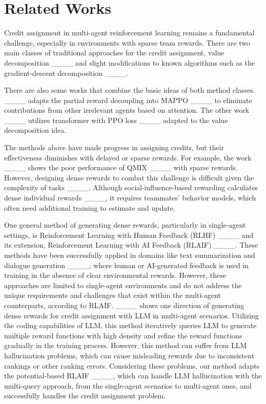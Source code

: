 \section{Related Works}
Credit assignment in multi-agent reinforcement learning remains a fundamental challenge, especially in environments with sparse team rewards. There are two main classes of traditional approaches for the credit assignment, value decomposition ____ and slight modifications to known algorithms such as the gradient-descent decomposition ____. 

There are also some works that combine the basic ideas of both method classes. ____ adapts the partial reward decoupling into MAPPO ____ to eliminate contributions from other irrelevant agents based on attention. The other work ____ utilizes transformer with PPO loss ____ adapted to the value decomposition idea.

The methods above have made progress in assigning credits, but their effectiveness diminishes with delayed or sparse rewards. For example, the work ____ shows the poor performance of QMIX ____ with sparse rewards. However, designing dense rewards to combat this challenge is difficult given the complexity of tasks ____. Although social-influence-based rewarding calculates dense individual rewards ____, it requires teammates' behavior models, which often need additional training to estimate and update.

One general method of generating dense rewards, particularly in single-agent settings, is Reinforcement Learning with Human Feedback (RLHF) ____ and its extension, Reinforcement Learning with AI Feedback (RLAIF) ____. These methods have been successfully applied in domains like text summarization and dialogue generation ____, where human or AI-generated feedback is used in training in the absence of clear environmental rewards. However, these approaches are limited to single-agent environments and do not address the unique requirements and challenges that exist within the multi-agent counterparts, according to RLAIF. ____ shows one direction of generating dense rewards for credit assignment with LLM in multi-agent scenarios. Utilizing the coding capabilities of LLM, this method iteratively queries LLM to generate multiple reward functions with high density and refine the reward functions gradually in the training process. However, this method can suffer from LLM hallucination problems, which can cause misleading rewards due to inconsistent rankings or other ranking errors. Considering these problems, our method adapts the potential-based RLAIF ____, which can handle LLM hallucination with the multi-query approach, from the single-agent scenarios to multi-agent ones, and successfully handles the credit assignment problem.